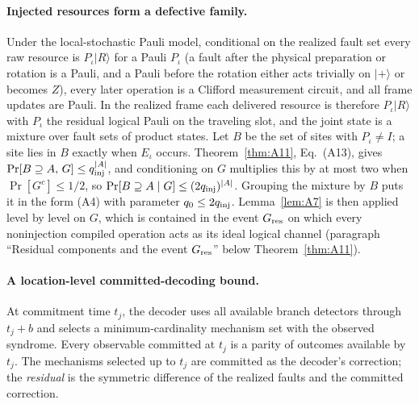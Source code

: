 \documentclass[aps,prx,reprint,superscriptaddress,nofootinbib,floatfix,longbibliography]{revtex4-2}
\theoremstyle{definition}
\begin{document}
\paragraph{Injected resources form a defective family.}
Under the local-stochastic Pauli model, conditional on the realized fault set
every raw resource is $P_\iota|R\rangle$ for a Pauli $P_\iota$ (a fault after
the physical preparation or rotation is a Pauli, and a Pauli before the
rotation either acts trivially on $|+\rangle$ or becomes $Z$), every later
operation is a Clifford measurement circuit, and all frame updates are
Pauli.  In the realized frame each delivered resource is therefore
$P_\iota|R\rangle$ with $P_\iota$ the residual logical Pauli on the traveling
slot, and the joint state is a mixture over fault sets of product states.
Let $B$ be the set of sites with $P_\iota\neq I$; a site lies in $B$ exactly
when $E_\iota$ occurs.  Theorem~\ref{thm:A11}, Eq.~(A13), gives
$\Pr[B\supseteq A,\,G]\le q_{\rm inj}^{|A|}$, and conditioning on $G$ multiplies this
by at most two when $\Pr[G^c]\le1/2$, so
$\Pr[B\supseteq A\mid G]\le(2q_{\rm inj})^{|A|}$.  Grouping the mixture by $B$ puts it
in the form (A4) with parameter $q_0\le2q_{\rm inj}$.  Lemma~\ref{lem:A7} is then
applied level by level on $G$, which is contained in the event $G_{\rm res}$
on which every noninjection compiled operation acts as its ideal logical
channel (paragraph ``Residual components and the event $G_{\rm res}$''
below Theorem~\ref{thm:A11}).

\paragraph{A location-level committed-decoding bound.}
At commitment time $t_j$, the decoder uses all available branch detectors
through $t_j+b$ and selects a minimum-cardinality mechanism set with the
observed syndrome.  Every observable committed at $t_j$ is a parity of
outcomes available by $t_j$.  The mechanisms selected up to $t_j$ are
committed as the decoder's correction; the \emph{residual} is the symmetric
difference of the realized faults and the committed correction.
\end{document}
